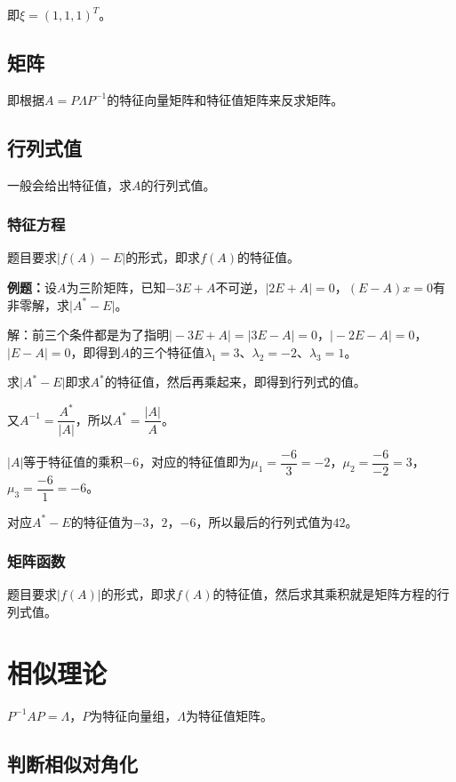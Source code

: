 即$\xi=(1,1,1)^T$。

\subsection{矩阵}

即根据$A=P\Lambda P^{-1}$的特征向量矩阵和特征值矩阵来反求矩阵。

\subsection{行列式值}

一般会给出特征值，求$A$的行列式值。

\subsubsection{特征方程}

题目要求$\vert f(A)-E\vert$的形式，即求$f(A)$的特征值。

\textbf{例题：}设$A$为三阶矩阵，已知$-3E+A$不可逆，$\vert2E+A\vert=0$，$(E-A)x=0$有非零解，求$\vert A^*-E\vert$。

解：前三个条件都是为了指明$\vert-3E+A\vert=\vert3E-A\vert=0$，$\vert-2E-A\vert=0$，$\vert E-A\vert=0$，即得到$A$的三个特征值$\lambda_1=3$、$\lambda_2=-2$、$\lambda_3=1$。

求$\vert A^*-E\vert$即求$A^*$的特征值，然后再乘起来，即得到行列式的值。

又$A^{-1}=\dfrac{A^*}{\vert A\vert}$，所以$A^*=\dfrac{\vert A\vert}{A}$。

$\vert A\vert$等于特征值的乘积$-6$，对应的特征值即为$\mu_1=\dfrac{-6}{3}=-2$，$\mu_2=\dfrac{-6}{-2}=3$，$\mu_3=\dfrac{-6}{1}=-6$。

对应$A^*-E$的特征值为$-3$，$2$，$-6$，所以最后的行列式值为$42$。

\subsubsection{矩阵函数}

题目要求$\vert f(A)\vert$的形式，即求$f(A)$的特征值，然后求其乘积就是矩阵方程的行列式值。

\section{相似理论}

$P^{-1}AP=\Lambda$，$P$为特征向量组，$\Lambda$为特征值矩阵。

\subsection{判断相似对角化}

